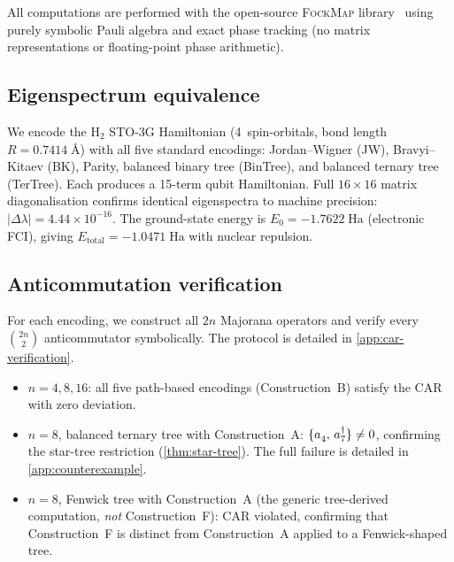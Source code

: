 %

All computations are performed with the open-source \textsc{FockMap}
library~\cite{fockmap2026} using purely symbolic Pauli algebra and
exact phase tracking (no matrix representations or floating-point
phase arithmetic).

\subsection{Eigenspectrum equivalence}
\label{sec:val-eigen}

We encode the H$_2$ STO-3G Hamiltonian (4~spin-orbitals, bond length
$R = 0.7414\;\text{\AA}$) with all five standard encodings:
Jordan--Wigner (JW), Bravyi--Kitaev (BK), Parity, balanced binary
tree (BinTree), and balanced ternary tree (TerTree).  Each produces a
15-term qubit Hamiltonian.  Full $16 \times 16$ matrix diagonalisation
confirms identical eigenspectra to machine precision:
$|\Delta\lambda| = 4.44 \times 10^{-16}$.  The ground-state energy is
$E_0 = -1.7622\;\text{Ha}$ (electronic FCI), giving
$E_\text{total} = -1.0471\;\text{Ha}$ with nuclear repulsion.

\subsection{Anticommutation verification}
\label{sec:val-car}

For each encoding, we construct all $2n$ Majorana operators and verify
every $\binom{2n}{2}$ anticommutator symbolically.  The protocol is
detailed in \cref{app:car-verification}.

\begin{itemize}
  \item $n = 4, 8, 16$: all five path-based encodings (Construction~B)
    satisfy the CAR with zero deviation.
  \item $n = 8$, balanced ternary tree with Construction~A:
    $\acomm{\an{4}}{\ad{7}} \neq 0$, confirming the star-tree
    restriction (\cref{thm:star-tree}).  The full failure is detailed
    in \cref{app:counterexample}.
  \item $n = 8$, Fenwick tree with Construction~A (the generic
    tree-derived computation, \emph{not} Construction~F): CAR
    violated, confirming that Construction~F is distinct from
    Construction~A applied to a Fenwick-shaped tree.
\end{itemize}

